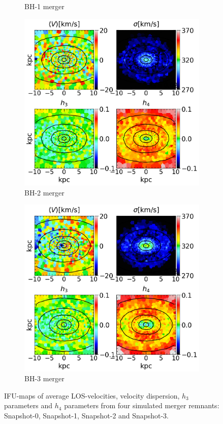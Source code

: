\documentclass[english, oneside]{HYgradu}
\begin{document}
\begin{figure}
\begin{subfigure}[b]{0.49\textwidth}
		\caption{BH-1 merger}
	\end{subfigure}
	\begin{subfigure}[b]{0.49\textwidth}
		\includegraphics[width=\textwidth]{BH_2.png}
		\caption{BH-2 merger}
	\end{subfigure}
	\begin{subfigure}[b]{0.49\textwidth}
		\includegraphics[width=\textwidth]{BH_3.png}
		\caption{BH-3 merger}
	\end{subfigure}
	\caption{IFU-maps of average LOS-velocities, velocity dispersion, $h_3$ parameters and $h_4$ parameters from four simulated merger remnants: Snapshot-0, Snapshot-1, Snapshot-2 and Snapshot-3.}
	\label{figure:all_voronoi_1}
\end{figure}
\end{document}
